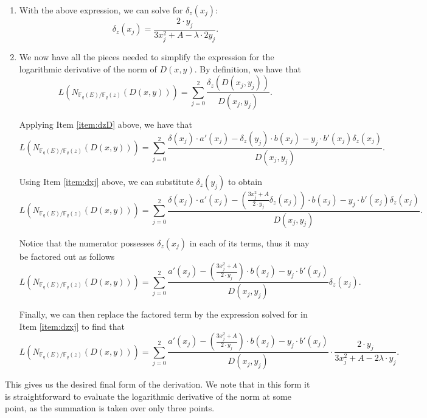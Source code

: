 \documentclass{article}
\theoremstyle{definition}
\newcommand{\6}{\mathbf}
\newcommand{\7}{\mathcal}
\begin{document}
\begin{enumerate}
\item \label{item:dzxj} With the above expression, we can solve for $\delta_z(x_j)$:
$$\delta_z(x_j) = \frac{2 \cdot y_j}{3x_j^2 + A - \lambda \cdot 2 y_j}.$$

\item We now have all the pieces needed to simplify the expression for the logarithmic derivative of the norm of $D(x,y)$. By definition, we have that
$$L(N_{\mathbb{F}_q(E)/\mathbb{F}_q(z)}(D(x,y))) =  \sum_{j = 0}^2 \frac{\delta_z(D(x_j,y_j))}{D(x_j,y_j)}.$$


Applying Item \ref{item:dzD} above, we have that
$$L(N_{\mathbb{F}_q(E)/\mathbb{F}_q(z)}(D(x,y))) =  \sum_{j = 0}^2 \frac{\delta(x_j) \cdot a'(x_j) - \delta_z(y_j) \cdot b(x_j) - y_j \cdot b'(x_j) \delta_z(x_j)}{D(x_j,y_j)}.$$

Using Item \ref{item:dxj} above, we can substitute $\delta_z(y_j)$ to obtain
$$L(N_{\mathbb{F}_q(E)/\mathbb{F}_q(z)}(D(x,y))) =  \sum_{j = 0}^2 \frac{\delta(x_j) \cdot a'(x_j) - \left( \frac{3x_j^2 + A}{2 \cdot y_j} \delta_z(x_j)\right) \cdot b(x_j) - y_j \cdot b'(x_j) \delta_z(x_j)}{D(x_j,y_j)}.$$

Notice that the numerator possesses $\delta_z(x_j)$ in each of its terms, thus it may be factored out as follows
$$L(N_{\mathbb{F}_q(E)/\mathbb{F}_q(z)}(D(x,y))) =  \sum_{j = 0}^2 \frac{a'(x_j) - \left( \frac{3x_j^2 + A}{2 \cdot y_j}\right) \cdot b(x_j) - y_j \cdot b'(x_j)}{D(x_j,y_j)} \delta_z(x_j).$$

Finally, we can then replace the factored term by the expression solved for in Item \ref{item:dzxj} to find that
$$L(N_{\mathbb{F}_q(E)/\mathbb{F}_q(z)}(D(x,y))) =  \sum_{j = 0}^2 \frac{a'(x_j) - \left( \frac{3x_j^2 + A}{2 \cdot y_j}\right) \cdot b(x_j) - y_j \cdot b'(x_j)}{D(x_j,y_j)} \cdot \frac{2 \cdot y_j}{3x_j^2 + A - 2 \lambda \cdot y_j}.$$
\end{enumerate}

This gives us the desired final form of the derivation. We note that in this form it is straightforward to evaluate the logarithmic derivative of the norm at some point, as the summation is taken over only three points.
\end{document}
